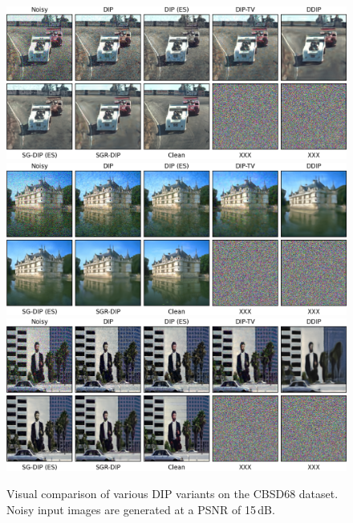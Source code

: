 \begin{figure}
    \centering
    \includegraphics[width=\textwidth]{img/fig_6.1_0.png}\\
    \vspace{20pt}
    \includegraphics[width=\textwidth]{img/fig_6.1_1.png}\\
    \vspace{20pt}
    \includegraphics[width=\textwidth]{img/fig_6.1_2.png}
    \caption{
        Visual comparison of various DIP variants on the CBSD68 dataset.
        Noisy input images are generated at a PSNR of 15\,dB.
    }\label{fig:CBSD68}
\end{figure}

